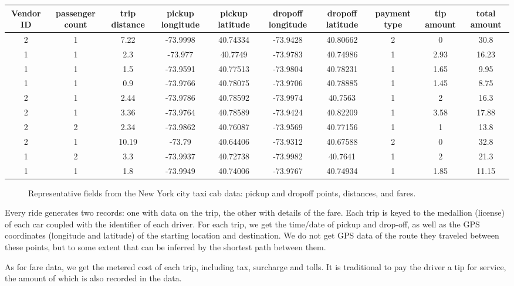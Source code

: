 \documentclass[10pt]{article}
\begin{document}
\begin{center}
\begin{tabular}{|c|c|c|c|c|c|c|c|c|c|}
\hline
Vendor ID & passenger count & trip distance & pickup longitude & pickup latitude & dropoff longitude & dropoff latitude & payment type & tip amount & total amount \\
\hline
2 & 1 & 7.22 & -73.9998 & 40.74334 & -73.9428 & 40.80662 & 2 & 0 & 30.8 \\
\hline
1 & 1 & 2.3 & -73.977 & 40.7749 & -73.9783 & 40.74986 & 1 & 2.93 & 16.23 \\
\hline
1 & 1 & 1.5 & -73.9591 & 40.77513 & -73.9804 & 40.78231 & 1 & 1.65 & 9.95 \\
\hline
1 & 1 & 0.9 & -73.9766 & 40.78075 & -73.9706 & 40.78885 & 1 & 1.45 & 8.75 \\
\hline
2 & 1 & 2.44 & -73.9786 & 40.78592 & -73.9974 & 40.7563 & 1 & 2 & 16.3 \\
\hline
2 & 1 & 3.36 & -73.9764 & 40.78589 & -73.9424 & 40.82209 & 1 & 3.58 & 17.88 \\
\hline
2 & 2 & 2.34 & -73.9862 & 40.76087 & -73.9569 & 40.77156 & 1 & 1 & 13.8 \\
\hline
2 & 1 & 10.19 & -73.79 & 40.64406 & -73.9312 & 40.67588 & 2 & 0 & 32.8 \\
\hline
1 & 2 & 3.3 & -73.9937 & 40.72738 & -73.9982 & 40.7641 & 1 & 2 & 21.3 \\
\hline
1 & 1 & 1.8 & -73.9949 & 40.74006 & -73.9767 & 40.74934 & 1 & 1.85 & 11.15 \\
\hline
\end{tabular}
\end{center}

\begin{figure}[h]
\centering
\caption{Representative fields from the New York city taxi cab data: pickup and dropoff points, distances, and fares.}
\end{figure}

Every ride generates two records: one with data on the trip, the other with details of the fare. Each trip is keyed to the medallion (license) of each car coupled with the identifier of each driver. For each trip, we get the time/date of pickup and drop-off, as well as the GPS coordinates (longitude and latitude) of the starting location and destination. We do not get GPS data of the route they traveled between these points, but to some extent that can be inferred by the shortest path between them.

As for fare data, we get the metered cost of each trip, including tax, surcharge and tolls. It is traditional to pay the driver a tip for service, the amount of which is also recorded in the data.
\end{document}
